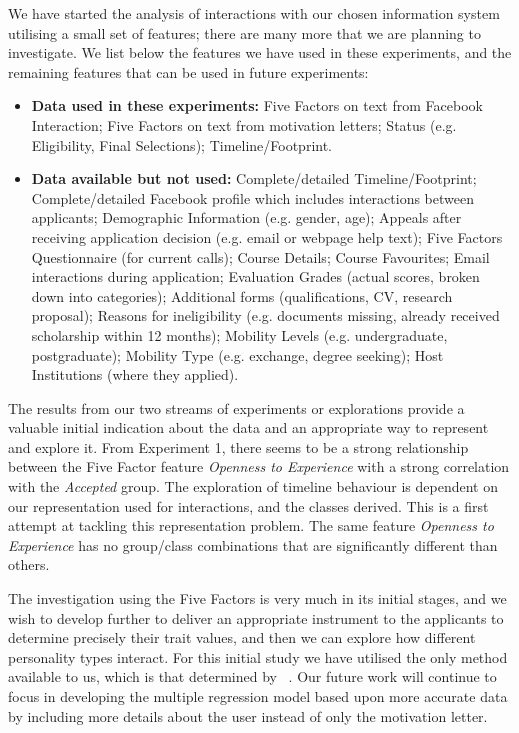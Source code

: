 \documentclass[letterpaper]{article}
\begin{document}
We have started the analysis of interactions with our chosen
information system utilising a small set of features; there are many
more that we are planning to investigate. We list below the features
we have used in these experiments, and the remaining features that can
be used in future experiments:

\begin{itemize}
\item {\textbf{Data used in these experiments:}} Five Factors on text
  from Facebook Interaction; Five Factors on text from motivation
  letters; Status (e.g. Eligibility, Final Selections); Timeline/Footprint.
\item {\textbf{Data available but not used:}} Complete/detailed
  Timeline/Footprint; Complete/detailed Facebook profile which
  includes interactions between applicants; Demographic Information
  (e.g. gender, age); Appeals after receiving application decision
  (e.g. email or webpage help text); Five Factors Questionnaire (for
  current calls); Course Details; Course Favourites; Email
  interactions during application; Evaluation Grades (actual scores,
  broken down into categories); Additional forms (qualifications, CV,
  research proposal); Reasons for ineligibility (e.g. documents
  missing, already received scholarship within 12 months); Mobility
  Levels (e.g. undergraduate, postgraduate); Mobility Type
  (e.g. exchange, degree seeking); Host Institutions (where they applied).
\end{itemize}

The results from our two streams of experiments or explorations
provide a valuable initial indication about the data and an
appropriate way to represent and explore it. From Experiment 1, there
seems to be a strong relationship between the Five Factor feature
{\emph{Openness to Experience}} with a strong correlation with the
{\emph{Accepted}} group. The exploration of timeline behaviour is
dependent on our representation used for interactions, and the classes
derived. This is a first attempt at tackling this representation
problem. The same feature {\emph{Openness to Experience}} has no
group/class combinations that are significantly different than others.

The investigation using the Five Factors is very much in its initial
stages, and we wish to develop further to deliver an appropriate
instrument to the applicants to determine precisely their trait
values, and then we can explore how different personality types
interact. For this initial study we have utilised the only method
available to us, which is that determined by
\citeauthor{mairesse-et-al:2007}~. Our
future work will continue to focus in developing the multiple
regression model based upon more accurate data by including more
details about the user instead of only the motivation letter.
\end{document}
